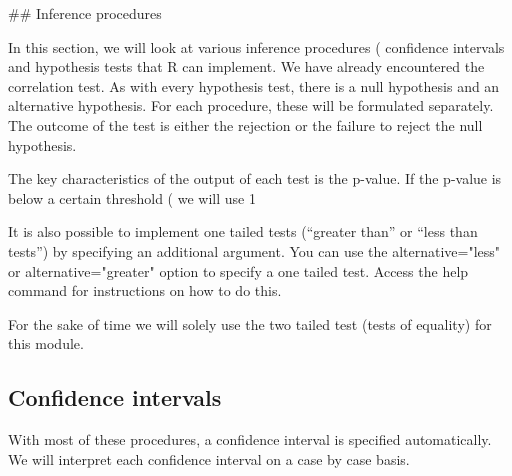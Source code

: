 ##  Inference procedures

In this section, we will look at various inference procedures ( confidence intervals and hypothesis tests that R can implement. We have already encountered the correlation test. 
As with every hypothesis test, there is a null hypothesis and an alternative hypothesis.
For each procedure, these will be formulated separately. The outcome of the test is either the rejection or the failure to reject the null hypothesis.

The key characteristics of the output of each test is the p-value. If the p-value is below a certain threshold ( we will use 1%

It is also possible to implement one tailed tests (“greater than” or “less than tests”) by specifying an additional argument. You can use the alternative="less" or alternative="greater" option to specify a one tailed test. Access the help command for instructions on how to do this. 

For the sake of time we will solely use the two tailed test (tests of equality) for this 
module.

\subsection{Confidence intervals}
With most of these procedures, a confidence interval is specified automatically. We will interpret each confidence interval on a case by case basis.




